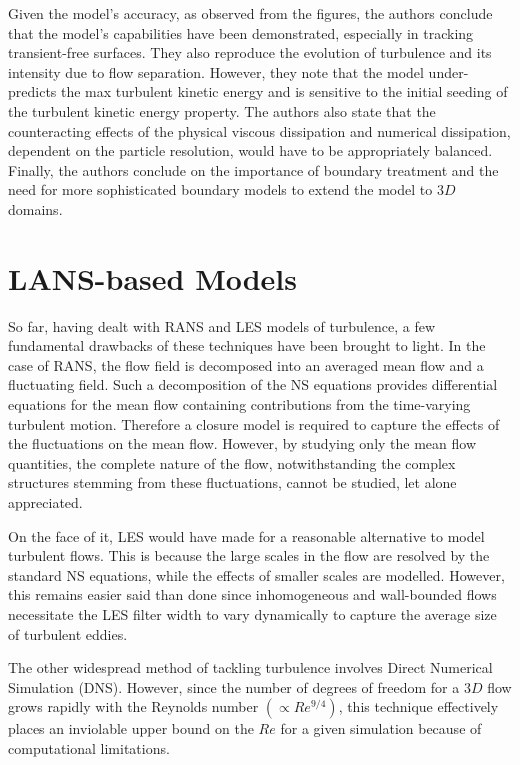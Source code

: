 Given the model’s accuracy, as observed from the figures, the authors conclude that the model’s capabilities have been demonstrated, especially in tracking transient-free surfaces. They also reproduce the evolution of turbulence and its intensity due to flow separation. 
However, they note that the model under-predicts the max turbulent kinetic energy and is sensitive to the initial seeding of the turbulent kinetic energy property.
The authors also state that the counteracting effects of the physical viscous dissipation and numerical dissipation, dependent on the particle resolution, would have to be appropriately balanced.
Finally, the authors conclude on the importance of boundary treatment and the need for more sophisticated boundary models to extend the model to $3D$ domains.


\section{LANS-based Models}
So far, having dealt with RANS and LES models of turbulence, a few fundamental drawbacks of these techniques have been brought to light.
In the case of RANS, the flow field is decomposed into
an averaged mean flow and a fluctuating field. Such a decomposition of the NS equations provides differential equations for the mean flow containing contributions from the time-varying turbulent motion. Therefore a closure model is required to capture the effects of the fluctuations on the mean flow. However, by studying only the mean flow quantities, the complete nature of the flow, notwithstanding the complex structures stemming from these fluctuations, cannot be studied, let alone appreciated.

On the face of it, LES would have made for a reasonable alternative to model turbulent flows. This is because the large scales in the flow are resolved by the standard NS equations, while the effects of smaller scales are modelled. However, this remains easier said than done since inhomogeneous and wall-bounded flows necessitate the LES filter width to vary dynamically to capture the average size of turbulent eddies.

The other widespread method of tackling turbulence involves Direct Numerical Simulation (DNS). However, since the number of degrees of freedom for a $3D$ flow grows rapidly with the Reynolds number $(\propto Re^{9/4})$, this technique effectively places an inviolable upper bound on the $Re$ for a given simulation because of computational limitations.

